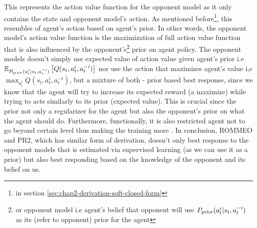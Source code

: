 This represents the action value function for the opponent model as it only contains the state and opponent model's action. As mentioned before\footnote{in section \ref{sec:chap2-derivation-soft-closed-form}}, this resembles  of agent's action based on agent's prior. In other words, the opponent model's action value function is the maximization of full action value function that is also influenced by the opponent's\footnote{or opponent model i.e agent's belief that opponent will use $P_{\text{prior}} (a^i_t | s_t, a^{-i}_t)$ as its (refer to opponent) prior for the agent} prior on agent policy. The opponent models doesn't simply use expected value of action value given agent's prior i.e $\mathbb{E}_{P_{\text{prior}} (a^i_t | s_t, a^{-i}_t)}\left[ Q(s_t, a^i_t, a^{-i}_t) \right]$ nor use the action that maximizes agent's value i,e $\max_{a^i_t} Q(s_t, a^i_t, a^{-i}_t)$, but a mixture of both - prior based best response, since we know that the agent will try to increase its expected reward (a maximize) while trying to acts similarly to its prior (expected value). This is crucial since the prior not only a regularizer for the agent but also the opponent's prior on what the agent should do. Furthermore, functionally, it is also restricted agent not to go beyond certain level thus making the training more . In conclusion, ROMMEO and PR2, which has similar form of derivation, doesn't only best response to the opponent models that is estimated via supervised learning (as we can use it as a prior) but also best responding based on the knowledge of the opponent and its belief on us.

